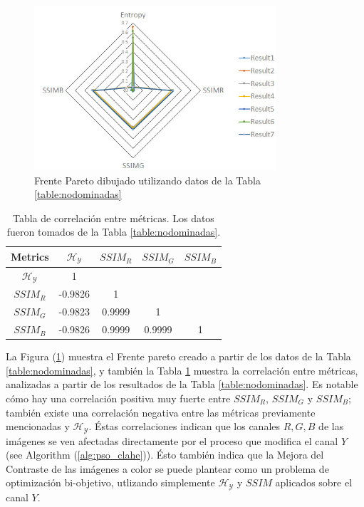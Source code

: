 \begin{figure}[H]
    \centering
        \includegraphics[width=0.80\textwidth]{./Figures/pareto_front.jpg}
    \caption{Frente Pareto dibujado utilizando datos de la Tabla \ref{table:nodominadas} }\label{fig:pareto_front}
\end{figure}

\begin{table}[H]
\setlength{\abovecaptionskip}{2pt plus 3pt minus 2pt} %
\caption[Parámetros de entrada para $MOPSO$]{Tabla de correlación entre métricas. Los datos fueron tomados de la Tabla \ref{table:nodominadas}.}
\begin{center}
 \begin{tabular}{||c | c c c c||} 
 \hline
Metrics & $\mathscr{H_Y}$ & $SSIM_R$ & $SSIM_G$ & $SSIM_B$ \\ 
\hline
$\mathscr{H_Y}$ & 1 &   &   &  \\ 
\hline
$SSIM_R$ & -0.9826  & 1 &  &  \\ 
\hline
$SSIM_G$ & -0.9823 & 0.9999   & 1   &  \\ 
\hline
$SSIM_B$ & -0.9826 & 0.9999   & 0.9999   & 1 \\ 
\hline
\end{tabular}
\end{center}
\label{table:correlacion}
\end{table}

La Figura (\ref{fig:pareto_front}) muestra el Frente pareto creado a partir de los datos de la Tabla \ref{table:nodominadas}, y también la Tabla \ref{table:correlacion} muestra la correlación entre métricas, analizadas a partir de los resultados de la Tabla \ref{table:nodominadas}. Es notable cómo hay una correlación positiva muy fuerte entre $SSIM_R$, $SSIM_G$ y $SSIM_B$; también existe una correlación negativa entre las métricas previamente mencionadas y $\mathscr{H_Y}$. Éstas correlaciones indican que los canales  $R,G,B$ de las imágenes se ven afectadas directamente por el proceso que modifica el canal $Y$ (see Algorithm (\ref{alg:pso_clahe})). Ésto también indica que la Mejora del Contraste de las imágenes a color se puede plantear como un problema de optimización bi-objetivo, utlizando simplemente $\mathscr{H_Y}$ y $SSIM$ aplicados sobre el canal $Y$.

